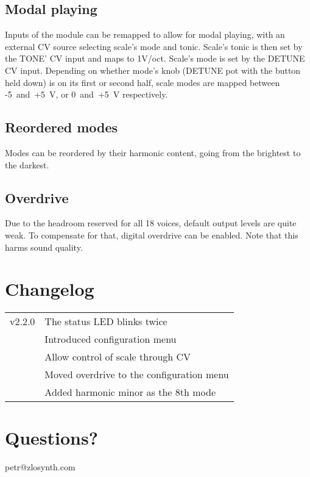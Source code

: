 \documentclass[10pt,nofoldmark,nocombine]{leaflet} %
\begin{document}
\subsection{Modal playing}

Inputs of the module can be remapped to allow for modal playing, with an external CV source selecting scale's mode and tonic. Scale's tonic is then set by the TONE' CV input and maps to 1V/oct. Scale's mode is set by the DETUNE CV input. Depending on whether mode's knob (DETUNE pot with the button held down) is on its first or second half, scale modes are mapped between -5~and~+5~V, or 0~and~+5~V respectively.

\subsection{Reordered modes}

Modes can be reordered by their harmonic content, going from the brightest to the darkest.

\subsection{Overdrive}

Due to the headroom reserved for all 18 voices, default output levels are quite weak. To compensate for that, digital overdrive can be enabled. Note that this harms sound quality.

\section{Changelog}

\begin{tabular}{@{}rl@{}}
  v2.2.0 & The status LED blinks twice \\
         & Introduced configuration menu \\
         & Allow control of scale through CV \\
         & Moved overdrive to the configuration menu \\
         & Added harmonic minor as the 8th mode
\end{tabular}

\section{Questions?}

\begin{center}
petr@zlosynth.com
\end{center}
\end{document}
